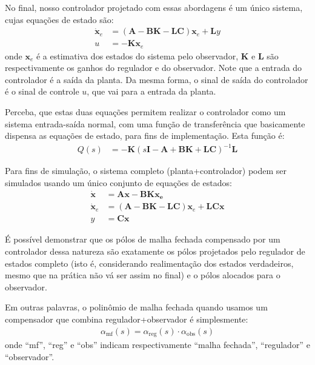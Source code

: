 \documentclass[
]{book}
\begin{document}


No final, nosso controlador projetado com essas abordagens é um único
sistema, cujas equações de estado são: \[ 
\begin{align*}
    \dot{\mathbf{x}}_e &= \mathbf{(A-BK-LC)}\mathbf{x}_e+\mathbf{L}y\\
    u &= \mathbf{-K}\mathbf{x}_e
\end{align*}
\] onde \(\mathbf{x}_e\) é a estimativa dos estados do sistema pelo
observador, \(\mathbf{K}\) e \(\mathbf{L}\) são respectivamente os ganhos do
regulador e do observador. Note que a entrada do controlador é a saída
da planta. Da mesma forma, o sinal de saída do controlador é o sinal de
controle \(u\), que vai para a entrada da planta.

Perceba, que estas duas equações permitem realizar o controlador como um
sistema entrada-saída normal, com uma função de transferência que
basicamente dispensa as equações de estado, para fins de implementação.
Esta função é: \[ 
\begin{align*}
    Q(s) &= -\mathbf{K}(s\mathbf{I-A+BK+LC})^{-1}\mathbf{L}
\end{align*}
\]

Para fins de simulação, o sistema completo (planta+controlador) podem
ser simulados usando um único conjunto de equações de estados: \[
\begin{align*}
\dot{\mathbf{x}} &= \mathbf{A}\mathbf{x}-\mathbf{BK}\mathbf{x_e}\\
\dot{\mathbf{x}}_e &= \mathbf{(A-BK-LC)}\mathbf{x}_e+\mathbf{LCx}\\
y&= \mathbf{Cx}
\end{align*}
\]

É possível demonstrar que os pólos de malha fechada compensado por um
controlador dessa natureza são exatamente os pólos projetados pelo
regulador de estados completo (isto é, considerando realimentação dos
estados verdadeiros, mesmo que na prática não vá ser assim no final) e o
pólos alocados para o observador.

Em outras palavras, o polinômio de malha fechada quando usamos um
compensador que combina regulador+observador é simplesmente: \[
\begin{align*}
    \alpha_{\text{mf}}(s) = \alpha_{\text{reg}}(s)\cdot \alpha_{\text{obs}}(s)
\end{align*}
\] onde ``mf'', ``reg'' e ``obs'' indicam respectivamente ``malha fechada'',
``regulador'' e ``observador''.
\end{document}
